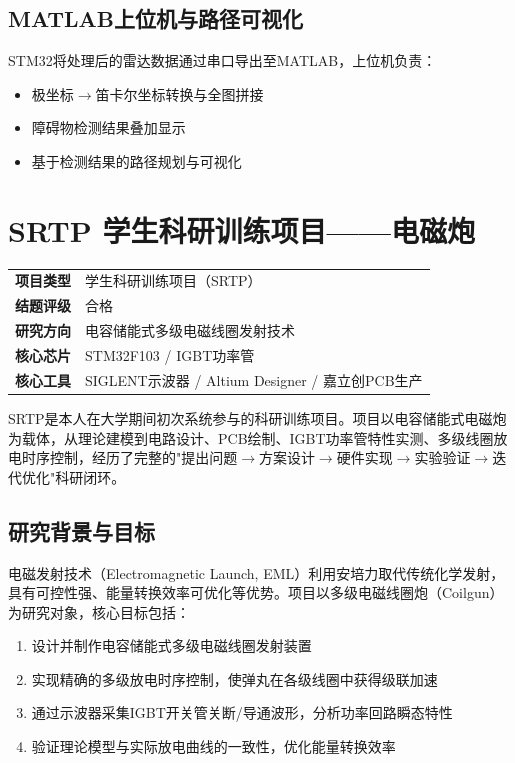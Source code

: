 \documentclass[12pt,a4paper]{ctexart}
\begin{document}
\subsection{MATLAB上位机与路径可视化}

STM32将处理后的雷达数据通过串口导出至MATLAB，上位机负责：

\begin{itemize}
    \item 极坐标$\to$笛卡尔坐标转换与全图拼接
    \item 障碍物检测结果叠加显示
    \item 基于检测结果的路径规划与可视化
\end{itemize}

\newpage
\section{SRTP 学生科研训练项目——电磁炮}

\begin{infobox}[项目概况]
\begin{tabular}{ll}
\textbf{项目类型} & 学生科研训练项目（SRTP） \\
\textbf{结题评级} & 合格 \\
\textbf{研究方向} & 电容储能式多级电磁线圈发射技术 \\
\textbf{核心芯片} & STM32F103 / IGBT功率管 \\
\textbf{核心工具} & SIGLENT示波器 / Altium Designer / 嘉立创PCB生产
\end{tabular}
\end{infobox}

SRTP是本人在大学期间初次系统参与的科研训练项目。项目以电容储能式电磁炮为载体，从理论建模到电路设计、PCB绘制、IGBT功率管特性实测、多级线圈放电时序控制，经历了完整的"提出问题$\to$方案设计$\to$硬件实现$\to$实验验证$\to$迭代优化"科研闭环。

\subsection{研究背景与目标}

电磁发射技术（Electromagnetic Launch, EML）利用安培力取代传统化学发射，具有可控性强、能量转换效率可优化等优势。项目以多级电磁线圈炮（Coilgun）为研究对象，核心目标包括：

\begin{enumerate}
    \item 设计并制作电容储能式多级电磁线圈发射装置
    \item 实现精确的多级放电时序控制，使弹丸在各级线圈中获得级联加速
    \item 通过示波器采集IGBT开关管关断/导通波形，分析功率回路瞬态特性
    \item 验证理论模型与实际放电曲线的一致性，优化能量转换效率
\end{enumerate}
\end{document}

